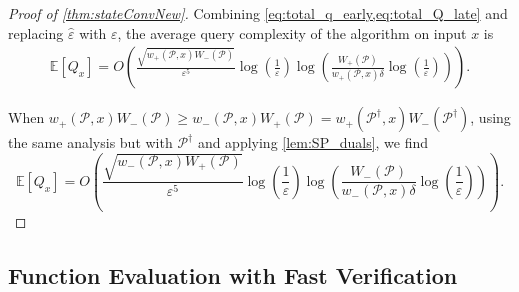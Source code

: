 \documentclass[cleveref, autoref, thm-restate,11pt]{article}
\theoremstyle{definition}
\renewcommand{\wp}[2]{{w_+({#1},{#2})}}
\newcommand{\wm}[2]{{w_-({#1},{#2})}}
\begin{document}
\begin{proof}[Proof of \cref{thm:stateConvNew}]
Combining \cref{eq:total_q_early,eq:total_Q_late} and replacing $\hat{\varepsilon}$ with $\varepsilon$, the average query complexity of the algorithm on input $x$ is
\begin{align}
\mathbb{E}[Q_x]=O\left(\frac{\sqrt{\wp{\mathscr P}{x}
W_-(\mathscr P)}}{\varepsilon^{5}}\log\left(\frac{1}{\varepsilon}\right)\log\left(\frac{W_+(\mathscr P)}{\wp{\mathscr P}{x}\delta}\log\left(\frac{1}{\varepsilon}\right)\right)\right).
\label{eq:exactStateConv}
\end{align}

When $w_+(\mathscr P,x)W_-(\mathscr P)\geq w_-(\mathscr P,x)W_+(\mathscr P)=w_+(\mathscr P^\dagger,x)W_-(\mathscr P^\dagger)$, using the same analysis but with $\mathscr P^\dagger$ and applying \cref{lem:SP_duals}, we find 
\begin{equation}
\mathbb{E}[Q_x]=O\left(\frac{\sqrt{\wm{\mathscr P}{x}
W_+(\mathscr P)}}{\varepsilon^{5}}\log\left(\frac{1}{\varepsilon}\right)\log\left(\frac{W_-(\mathscr P)}{\wm{\mathscr P}{x}\delta}\log\left(\frac{1}{\varepsilon}\right)\right)\right).
\end{equation}






\end{proof}
















\subsection{Function Evaluation with Fast Verification}
\end{document}
